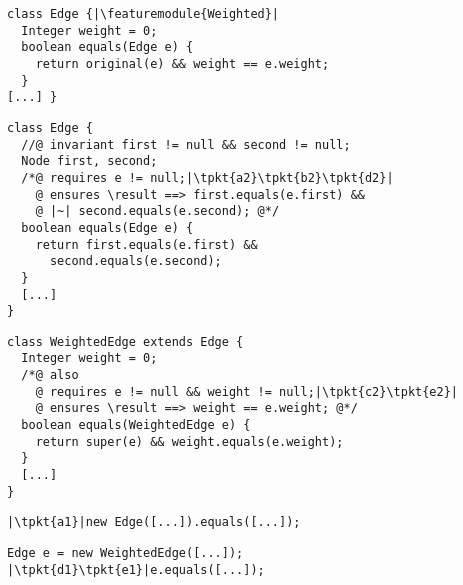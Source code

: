 \newsavebox{\pcweight}
\begin{lrbox}{\pcweight}
	\begin{minipage}{72mm}
\begin{lstlisting}
class Edge {|\featuremodule{Weighted}|
  Integer weight = 0;
  boolean equals(Edge e) {
    return original(e) && weight == e.weight;
  }
[...] }
\end{lstlisting}
	\end{minipage}
\end{lrbox}


\newsavebox{\bhsuper}
\begin{lrbox}{\bhsuper}
	\begin{minipage}{55mm}
\begin{lstlisting}
class Edge {
  //@ invariant first != null && second != null;
  Node first, second;
  /*@ requires e != null;|\tpkt{a2}\tpkt{b2}\tpkt{d2}|
    @ ensures \result ==> first.equals(e.first) &&
    @ |~| second.equals(e.second); @*/
  boolean equals(Edge e) {
    return first.equals(e.first) &&
      second.equals(e.second);
  }
  [...]
}
\end{lstlisting}
	\end{minipage}
\end{lrbox}

\newsavebox{\bhsub}
\begin{lrbox}{\bhsub}
	\begin{minipage}{55mm}
\begin{lstlisting}
class WeightedEdge extends Edge {
  Integer weight = 0;
  /*@ also
    @ requires e != null && weight != null;|\tpkt{c2}\tpkt{e2}|
    @ ensures \result ==> weight == e.weight; @*/
  boolean equals(WeightedEdge e) {
    return super(e) && weight.equals(e.weight);
  }
  [...]
}
\end{lstlisting}
	\end{minipage}
\end{lrbox}

\newsavebox{\bhone}
\begin{lrbox}{\bhone}
	\begin{minipage}{40mm}
\begin{lstlisting}
|\tpkt{a1}|new Edge([...]).equals([...]);
\end{lstlisting}
	\end{minipage}
\end{lrbox}

\newsavebox{\bhtwo}
\begin{lrbox}{\bhtwo}
	\begin{minipage}{40mm}
\begin{lstlisting}
Edge e = new WeightedEdge([...]);
|\tpkt{d1}\tpkt{e1}|e.equals([...]);
\end{lstlisting}
	\end{minipage}
\end{lrbox}

